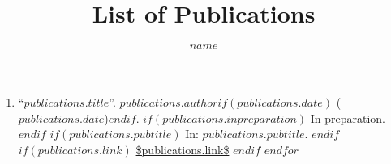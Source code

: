 \documentclass[11pt]{article}
\title{List of Publications}
\author{$name$}
\begin{document}
\maketitle

\begin{enumerate}
$for(publications)$
\item ``\href{$publications.link$}{$publications.title$}''. $publications.author$$if(publications.date)$ ($publications.date$)$endif$.
$if(publications.inpreparation)$
In preparation.
$endif$
$if(publications.pubtitle)$
In: \emph{$publications.pubtitle$}.
$endif$
$if(publications.link)$
\url{$publications.link$}
$endif$
$endfor$
\end{enumerate}
\end{document}
